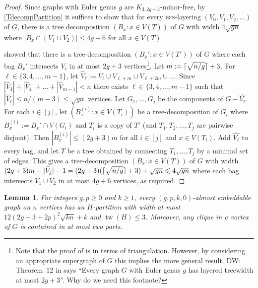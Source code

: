 \documentclass[12pt]{article}
\DeclarePairedDelimiter{\ceil}{\lceil}{\rceil}
\renewcommand{\geq}{\geqslant}
\renewcommand{\leq}{\leqslant}
\DeclareMathOperator{\tw}{tw}
\newcommand{\david}[1]{{\color{blue} DW: #1}}
\theoremstyle{plain}
\newtheorem{lem}[thm]{Lemma}
\theoremstyle{definition}
\begin{document}
\begin{proof}
    Since graphs with Euler genus $g$ are $K_{3,2g+3}$-minor-free, by \cref{TdecompPartition} it suffices to show that for every  \textsc{bfs}-layering $(V_0,V_1,V_2,\dots)$ of $G$, there is a tree decomposition $(B_x\colon x\in V(T))$ of $G$ with width $4{\sqrt{gn}}$ where $|B_x\cap (V_1\cup V_2)|\leq 4g+6$ for all $x\in V(T)$.
        
    \citet[Theorem~12]{DMW17} showed that there is a tree-decomposition $(B_x' \colon x\in V(T'))$ of $G$ where each bag $B_x'$ intersects $V_i$ in at most $2g+3$ vertices\footnote{Note that the proof of \citep[Theorem~12]{DMW17} is in terms of triangulation. However, by considering an appropriate supergraph of $G$ this implies the more general result. \david{Theorem~12 in \citep{DMW17} says ``Every graph $G$ with Euler genus $g$ has layered treewidth at most $2g +3$''. Why do we need this footnote?}}. Let $m:= \ceil{\sqrt{n/g}}+3$. For $\ell\in\{3,4,\dots,m-1\}$, let $\widehat{V}_\ell:= V_\ell \cup V_{\ell+m}\cup V_{\ell+2m} \cup\dots$. Since $|\widehat{V}_3|+|\widehat{V}_4|+\dots+|\widehat{V}_{m-1}| < n$ there exists $\ell\in\{3,4,\dots,m-1\}$ such that $|\widehat{V}_{\ell}|\leq n/(m-3) \leq \sqrt{gn}$ vertices. Let $G_1,\dots,G_j$ be the components of $G-\widehat{V_{\ell}}$. For each $i\in [j]$, let $(B_x^{(i)}\colon x\in V(T_i))$ be a tree-decomposition of $G_i$ where $B_x^{(i)}:= B_x' \cap V(G_i)$ and $T_i$ is a copy of $T'$ (and $T_1,T_2,\dots,T_j$ are pairwise disjoint). Then $|B_x^{(i)}|\leq (2g+3)m$ for all $i\in [j]$ and $x\in V(T_i)$. Add $\hat{V_{\ell}}$ to every bag, and let $T$ be a tree obtained by connecting $T_1,\dots,T_j$ by a minimal set of edges. This gives a tree-decomposition $(B_x\colon x\in V(T))$ of $G$ with width $(2g+3)m+|\widehat{V}_j|-1=  (2g+3)( \ceil{\sqrt{n/g}}+3)+\sqrt{gn}\leq 4{\sqrt{gn}}$ where each bag intersects $V_1 \cup V_2$ in at most $4g+6$ vertices, as required. 
\end{proof}

\begin{lem}\label{AlternativeAlmostEmbeddable}
    For integers $g,p\geq 0$ and $k\geq 1$, every $(g,p,k,0)$-almost embeddable graph on $n$ vertices has an $H$-partition with width at most $12(2g+3+2p)^2\sqrt{kn}+k$ and $\tw(H)\leq 3$. Moreover, any clique in a vortex of $G$ is contained in at most two parts.
\end{lem}
\end{document}
